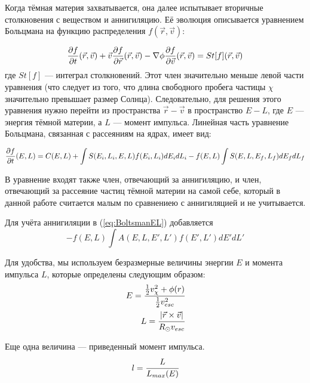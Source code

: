 Когда тёмная материя захватывается, она далее испытывает вторичные столкновения с веществом и аннигиляцию. Её эволюция описывается уравнением Больцмана на функцию распределения $f(\vec{r},\vec{v})$:

\begin{equation}
	\label{eq:Boltsman}
	\frac{\partial f}{\partial t}(\vec{r},\vec{v}) + \vec{v} \frac{\partial f}{\partial \vec{r}}(\vec{r},\vec{v}) - \nabla \phi \frac{\partial f}{\partial \vec{v}}(\vec{r},\vec{v}) = 
	St[f] (\vec{r},\vec{v})
\end{equation} 
где $St[f]$ --- интеграл столкновений. Этот член значительно меньше левой части уравнения (что следует из того, что длина свободного пробега частицы $\chi$ значительно превышает размер Солнца). Следовательно, для решения этого уравнения нужно перейти из пространства $\vec{r}-\vec{v}$ в пространство $E-L$, где $E$ --- энергия тёмной материи, а $L$ --- момент импульса. Линейная часть уравнение Больцмана, связанная с рассеяниям на ядрах, имеет вид:

\begin{equation}
	\label{eq:BoltsmanEL}
	\frac{\partial f}{\partial t}(E,L) = C(E,L) + \int{ S(E_i,L_i,E,L) f(E_i,L_i) dE_idL_i } 
	-f(E,L) \int{ S(E,L,E_f,L_f)  dE_fdL_f }
\end{equation}

В уравнение входят также член, отвечающий за аннигиляцию, и член, отвечающий за рассеяние частиц тёмной материи на самой себе, который в данной работе считается малым по сравнениею с аннигиляцией и не учитывается.

Для учёта аннигиляции в (\ref{eq:BoltsmanEL}) добавляется 
\begin{equation}
	-\label{eq:BoltsmanAnn}
	f(E,L) \int{ A(E,L,E',L') f(E',L') dE'dL' }
\end{equation}

Для удобства, мы используем безразмерные величины энергии $E$ и момента импульса $L$, которые определены следующим образом:
\begin{equation}
	\begin{split}
		E = \cfrac{\frac{1}{2} v_{\chi}^2 + \phi(r)}
		{\frac{1}{2} v_{esc}^2} \\
		L = \cfrac{|\vec{r} \times \vec{v}|}
		{R_{\odot} v_{esc}}
	\end{split}
	\label{eq:dimentionless}
\end{equation}

Еще одна величина --- приведенный момент импульса.
\begin{equation}
	l = \cfrac{L}{L_{max}(E)}
\end{equation}


